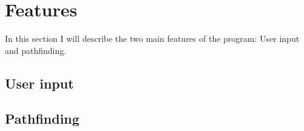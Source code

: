 \section{Features}
\label{02}

In this section I will describe the two main features of the program: User input and pathfinding.

\subsection{User input}
\label{02_01}

\subsection{Pathfinding}
\label{02_02}